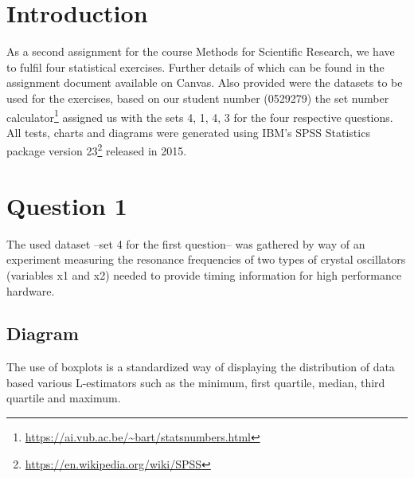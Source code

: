 \documentclass[14]{article}
\begin{document}
\author{\textbf{Faculty of Sciences and Bio-Engineering Sciences}\\[2\baselineskip]\newline\textbf{Arthur Chomé - 0529279}}

\date{ \LARGE Assignment 2: Statistics}
\title{\vspace{-8cm}}%

\maketitle

\section{Introduction}
As a second assignment for the course Methods for Scientific Research, we have to fulfil four statistical exercises. Further details of which can be found in the assignment document available on Canvas. Also provided were the datasets to be used for the exercises, based on our student number (0529279) the set number calculator\footnote{\protect\url{https://ai.vub.ac.be/~bart/statsnumbers.html}} assigned us with the sets 4, 1, 4, 3 for the four respective questions. All tests, charts and diagrams were generated using IBM's SPSS Statistics package version 23\footnote{\protect\url{https://en.wikipedia.org/wiki/SPSS}} released in 2015. 

\section{Question 1}
The used dataset --set 4 for the first question-- was gathered by way of an experiment measuring the resonance frequencies of two types of crystal oscillators (variables x1 and x2) needed to provide timing information for high performance hardware. 

\subsection{Diagram}
The use of boxplots is a standardized way of displaying the distribution of data based various L-estimators such as the minimum, first quartile, median, third quartile and maximum.
\end{document}
